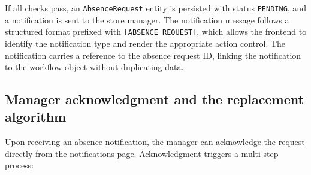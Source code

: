 \par If all checks pass, an \texttt{AbsenceRequest} entity is persisted with status \texttt{PENDING}, and a notification is sent to the store manager. The notification message follows a structured format prefixed with \texttt{[ABSENCE REQUEST]}, which allows the frontend to identify the notification type and render the appropriate action control. The notification carries a reference to the absence request ID, linking the notification to the workflow object without duplicating data.

\subsection{Manager acknowledgment and the replacement algorithm}
\par Upon receiving an absence notification, the manager can acknowledge the request directly from the notifications page. Acknowledgment triggers a multi-step process:

